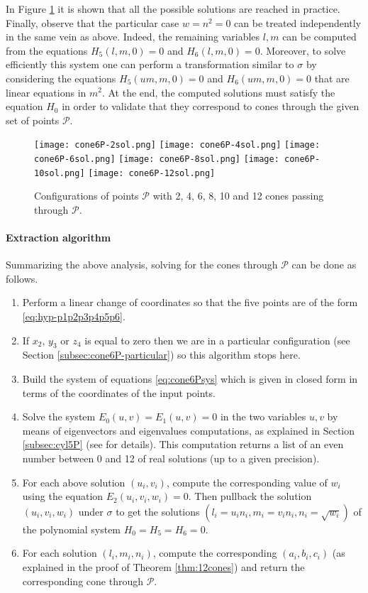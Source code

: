\documentclass[5p]{elsarticle}
\newcommand\Pc{\mathcal P}
\newcommand{\com}[1]{{\color{black} #1}}
\begin{document}
In Figure \ref{fig:cones} it is shown that all the \com{possible solutions} are reached in practice. Finally, observe that the particular case $w=n^2=0$ can be treated independently in the same \com{vein} as above. Indeed, the remaining variables $l,m$ can be computed from the equations $H_5(l,m,0)=0$ and $H_6(l,m,0)=0$. Moreover, to solve efficiently this system one can perform a transformation similar to $\sigma$ by considering the equations $H_5(um,m,0)=0$ and $H_6(um,m,0)=0$ that are linear equations in $m^2$. At the end, the computed solutions \com{must satisfy} the equation $H_0$ in order to validate that they correspond to cones through the given set of points $\Pc$.   

\begin{figure}[ht!]
\centering	
   \texttt{[image: cone6P-2sol.png]}
   \texttt{[image: cone6P-4sol.png]}
   \texttt{[image: cone6P-6sol.png]}
   \texttt{[image: cone6P-8sol.png]}
   \texttt{[image: cone6P-10sol.png]}
   \texttt{[image: cone6P-12sol.png]}
   \caption{Configurations of points $\Pc$ with 2, 4, 6, 8, 10 and 12 cones passing through $\Pc$.}
   \label{fig:cones}
\end{figure}  

\paragraph{Extraction algorithm}

Summarizing the above analysis, \com{solving for the} cones through $\Pc$ can be done as follows. 

\begin{enumerate}
	\item Perform a linear change of coordinates so that the five points are of the form \eqref{eq:hyp-p1p2p3p4p5p6}. 
	\item If $x_2$, $y_3$ or $z_4$ is equal to zero then we are in a particular configuration (see Section \ref{subsec:cone6P-particular}) \com{so this} algorithm stops here.  
	\item Build the system of equations \eqref{eq:cone6Psys} which is given in closed form in terms of the coordinates of the input points.
	\item Solve the system $E_0(u,v)=E_1(u,v)=0$ in the two variables $u,v$ by means of eigenvectors and eigenvalues computations, as explained in Section \ref{subsec:cyl5P} (see \cite{BKM05} for details). \com{This computation} returns a list of an even number between 0 and 12 of \com{real} solutions (up to a given precision).  
	\item For each above solution $(u_i,v_i)$, compute the corresponding value of $w_i$ \com{using} the equation $E_2(u_i,v_i,w_i)=0$. \com{Then pullback} the solution $(u_i,v_i,w_i)$ under $\sigma$ to get the solutions $(l_i=u_in_i,m_i=v_in_i,n_i=\sqrt{w_i})$ of the polynomial system $H_0=H_5=H_6=0$. 
	\item For each solution $(l_i,m_i,n_i)$, compute the corresponding $(a_i,b_i,c_i)$ (as explained in the proof of Theorem \ref{thm:12cones}) and return the corresponding cone through $\Pc$.
\end{enumerate} 
\end{document}
